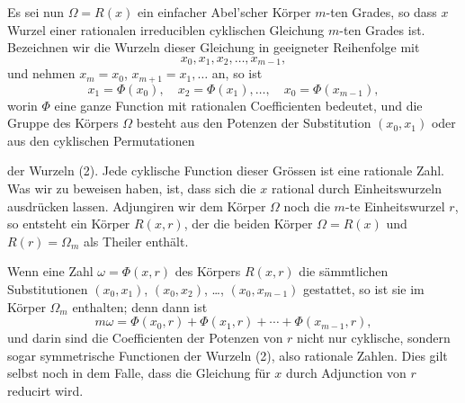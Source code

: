 \documentclass[11pt]{article}
\newcommand{\Om}{\Omega}
\begin{document}
Es sei nun $\Om=R(x)$ ein einfacher Abel'scher Körper $m$-ten Grades, so dass $x$ Wurzel einer rationalen irreduciblen cyklischen Gleichung $m$-ten Grades ist. Bezeichnen wir die Wurzeln dieser Gleichung in geeigneter Reihenfolge mit
\begin{equation}
  x_0,x_1,x_2,\ldots,x_{m-1},
\tag{2}
\end{equation}
und nehmen $x_m=x_0$, $x_{m+1}=x_1,\ldots$ an, so ist
\[
  x_1=\Phi(x_0),\quad x_2=\Phi(x_1),\ldots,\quad x_0=\Phi(x_{m-1}),
\]
worin $\Phi$ eine ganze Function mit rationalen Coefficienten bedeutet, und die Gruppe des Körpers $\Om$ besteht aus den Potenzen der Substitution $(x_0,x_1)$ oder aus den cyklischen Permutationen

der Wurzeln (2). Jede cyklische Function dieser Grössen ist eine rationale Zahl. Was wir zu beweisen haben, ist, dass sich die $x$ rational durch Einheitswurzeln ausdrücken lassen. Adjungiren wir dem Körper $\Om$ noch die $m$-te Einheitswurzel $r$, so entsteht ein Körper $R(x,r)$, der die beiden Körper $\Om=R(x)$ und $R(r)=\Omega_m$ als Theiler enthält.

Wenn eine Zahl $\omega=\Phi(x,r)$ des Körpers $R(x,r)$ die sämmtlichen Substitutionen $(x_0,x_1)$, $(x_0,x_2)$, \ldots, $(x_0,x_{m-1})$ gestattet, so ist sie im Körper $\Omega_m$ enthalten; denn dann ist
\[
  m\omega=\Phi(x_0,r)+\Phi(x_1,r)+\cdots+\Phi(x_{m-1},r),
\]
und darin sind die Coefficienten der Potenzen von $r$ nicht nur cyklische, sondern sogar symmetrische Functionen der Wurzeln (2), also rationale Zahlen. Dies gilt selbst noch in dem Falle, dass die Gleichung für $x$ durch Adjunction von $r$ reducirt wird.
\end{document}
